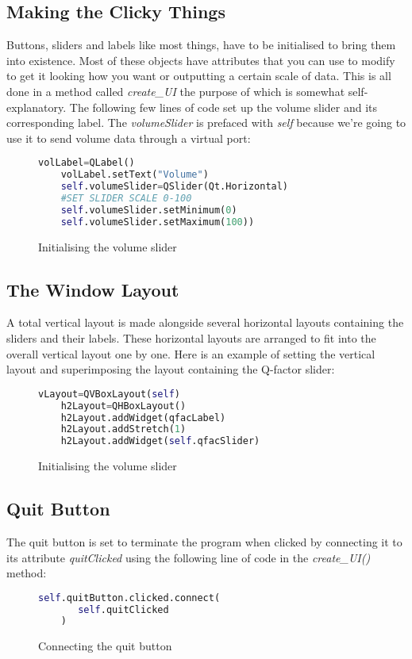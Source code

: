 \documentclass{article}
\begin{document}
\subsection{Making the Clicky Things}
Buttons, sliders and labels like most things, have to be initialised to bring them into existence. Most of these objects have attributes that you can use to modify to get it looking how you want or outputting a certain scale of data. This is all done in a method called \textit{create\_UI} the  purpose of which is somewhat self-explanatory. The following few lines of code set up the volume slider and its corresponding label. The \textit{volumeSlider} is prefaced with \textit{self} because we're going to use it to send volume data through a virtual port:
 \begin{figure}[H]
	\begin{lstlisting}[language=python]
	volLabel=QLabel()
	volLabel.setText("Volume")
	self.volumeSlider=QSlider(Qt.Horizontal)
	#SET SLIDER SCALE 0-100
	self.volumeSlider.setMinimum(0)
	self.volumeSlider.setMaximum(100)) 
	\end{lstlisting}
	\caption{Initialising the volume slider}

\end{figure}	
\subsection{The Window Layout}
A total vertical layout is made alongside several horizontal layouts containing the sliders and their labels. These horizontal layouts are  arranged to fit into the overall vertical layout one by one. Here is an example of setting the vertical layout and superimposing the layout containing the Q-factor slider: 
 \begin{figure}[H]
	\begin{lstlisting}[language=python]
	vLayout=QVBoxLayout(self)
	h2Layout=QHBoxLayout()
	h2Layout.addWidget(qfacLabel)
	h2Layout.addStretch(1)
	h2Layout.addWidget(self.qfacSlider)
	\end{lstlisting}
	\caption{Initialising the volume slider}
	
\end{figure}
\pagebreak
\subsection{Quit Button}
The quit button is set to terminate the program when clicked by connecting it to its attribute \textit{quitClicked} using the following line of code in the \textit{create\_UI()} method: 
 \begin{figure}[H]
	\begin{lstlisting}[language=python]
       self.quitButton.clicked.connect(
       self.quitClicked
	)
	\end{lstlisting}
	\caption{Connecting the quit button}
	
\end{figure}
 
\end{document}
